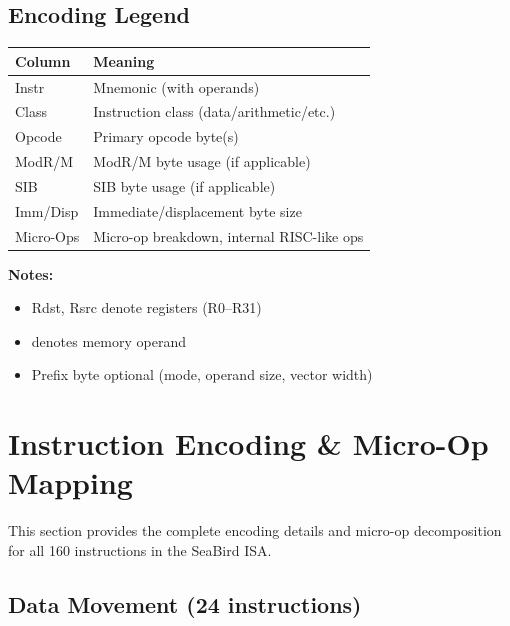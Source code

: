 \documentclass[12pt]{article}
\begin{document}
\subsection{Encoding Legend}

\begin{table}[h]
\centering
\begin{tabular}{@{}ll@{}}
\toprule
\textbf{Column} & \textbf{Meaning} \\ \midrule
Instr & Mnemonic (with operands) \\
Class & Instruction class (data/arithmetic/etc.) \\
Opcode & Primary opcode byte(s) \\
ModR/M & ModR/M byte usage (if applicable) \\
SIB & SIB byte usage (if applicable) \\
Imm/Disp & Immediate/displacement byte size \\
Micro-Ops & Micro-op breakdown, internal RISC-like ops \\ \bottomrule
\end{tabular}
\end{table}

\textbf{Notes:}

\begin{itemize}
    \item Rdst, Rsrc denote registers (R0--R31)
    \item [mem] denotes memory operand
    \item Prefix byte optional (mode, operand size, vector width)
\end{itemize}

\section{Instruction Encoding \& Micro-Op Mapping}

This section provides the complete encoding details and micro-op decomposition for all 160 instructions in the SeaBird ISA.

\subsection{Data Movement (24 instructions)}
\end{document}
